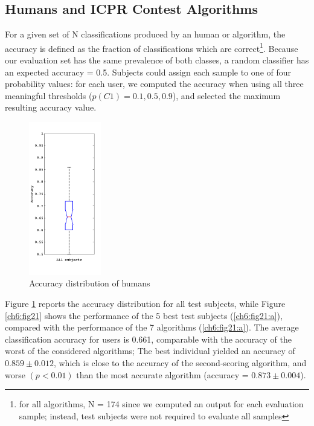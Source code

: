 \clearpage

\subsection{Humans and ICPR Contest Algorithms}

For a given set of N classifications produced by an human or algorithm, the accuracy is defined as the fraction of classifications which are 
correct\footnote{for all algorithms, N = 174 since we computed an output for each evaluation sample;
instead, test subjects were not required to evaluate all samples}.
Because our evaluation set has the same prevalence of both classes, a random classifier has an expected accuracy = 0.5. Subjects could assign each sample to one of
four probability values: for each user, we computed the accuracy when using all three meaningful thresholds ($p(C1) = {0.1, 0.5, 0.9}$), and selected the maximum
resulting accuracy value.\\

\begin{figure}[!htb]
   \begin{center}
    \includegraphics[width=0.28\textwidth]{./images/human/p11.png}
    \caption{Accuracy distribution of humans}
    \label{ch6:fig20}
    \end{center}
\end{figure}


Figure \ref{ch6:fig20} reports the accuracy distribution for all test subjects, while Figure \ref{ch6:fig21} shows the
performance of the 5 best test subjects (\ref{ch6:fig21:a}), compared with the performance
of the 7 algorithms (\ref{ch6:fig21:a}). The average classification accuracy for users is 0.661,
comparable with the accuracy of the worst of the considered algorithms; The best
individual yielded an accuracy of $0.859 \pm 0.012$, which is close to the accuracy
of the second-scoring algorithm, and worse $(p < 0.01)$ than the most accurate
algorithm (accuracy = $0.873 \pm 0.004$).


